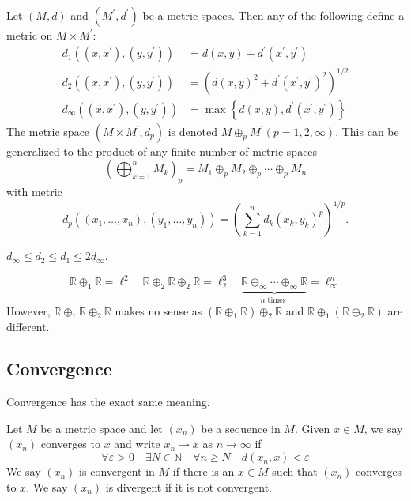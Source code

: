 \documentclass[a4paper,11pt]{article}
\begin{document}
\begin{definition}[Products]
    Let $(M, d)$ and $\left(M^{\prime}, d^{\prime}\right)$ be a metric spaces. Then any of the following define a metric on $M \times M^{\prime}:$
    \[
    \begin{aligned}
    d_{1}\left(\left(x, x^{\prime}\right),\left(y, y^{\prime}\right)\right) &=d(x, y)+d^{\prime}\left(x^{\prime}, y^{\prime}\right) \\
    d_{2}\left(\left(x, x^{\prime}\right),\left(y, y^{\prime}\right)\right) &=\left(d(x, y)^{2}+d^{\prime}\left(x^{\prime}, y^{\prime}\right)^{2}\right)^{1 / 2} \\
    d_{\infty}\left(\left(x, x^{\prime}\right),\left(y, y^{\prime}\right)\right) &=\max \left\{d(x, y), d^{\prime}\left(x^{\prime}, y^{\prime}\right)\right\}
    \end{aligned}
    \]
    The metric space $\left(M \times M^{\prime}, d_{p}\right)$ is denoted $M \oplus_{p} M^{\prime}(p=1,2, \infty)$. This can be generalized to the product of any finite number of metric spaces
    \[
        \left( \bigoplus_{k=1}^{n}M_k \right)_p = M_1 \oplus_{p}M_2\oplus_{p}\cdots\oplus_{p}M_n
    \]
    with metric
    \[
        d_p((x_1,\dots,x_n),(y_1,\dots,y_n)) = \left( \sum_{k=1}^n d_k(x_k,y_k)^p \right)^{1/p}.
    \]
\end{definition}
\begin{note}
    $d_{\infty} \leqslant d_{2} \leqslant d_{1} \leqslant 2 d_{\infty}$.
\end{note}
\begin{example}
    \[
\mathbb{R} \oplus_{1} \mathbb{R}=\ell_{1}^{2} \quad \mathbb{R} \oplus_{2} \mathbb{R} \oplus_{2} \mathbb{R}=\ell_{2}^{3} \quad \underbrace{\mathbb{R} \oplus_\infty \cdots \oplus_{\infty} \mathbb{R}}_{n \text { times }}=\ell_{\infty}^{n}
\]
However, $\mathbb{R} \oplus_{1} \mathbb{R} \oplus_{2} \mathbb{R}$ makes no sense as $\left(\mathbb{R} \oplus_{1} \mathbb{R}\right) \oplus_{2} \mathbb{R}$ and $\mathbb{R} \oplus_{1}\left(\mathbb{R} \oplus_{2} \mathbb{R}\right)$ are different.
\end{example}
\subsection{Convergence}
Convergence has the exact same meaning. 
\begin{definition}[Convergence]
    Let $M$ be a metric space and let $\left(x_{n}\right)$ be a sequence in $M$. Given $x \in M$, we say $\left(x_{n}\right)$ converges to $x$ and write $x_{n} \rightarrow x$ as $n \rightarrow \infty$ if
    \[
    \forall \varepsilon>0 \quad \exists N \in \mathbb{N} \quad \forall n \geqslant N \quad d\left(x_{n}, x\right)<\varepsilon
    \]
    We say $\left(x_{n}\right)$ is convergent in $M$ if there is an $x \in M$ such that $\left(x_{n}\right)$ converges to $x$. We say $\left(x_{n}\right)$ is divergent if it is not convergent.
\end{definition}
\end{document}
